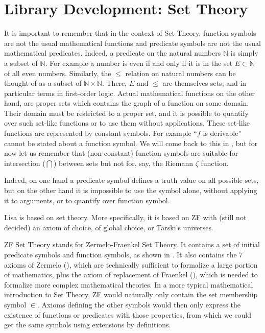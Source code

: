 
\chapter{Library Development: Set Theory}
\label{chapt:settheory}

It is important to remember that in the context of Set Theory, function symbols are not the usual mathematical functions and predicate symbols are not the usual mathematical predicates. Indeed, a predicate on the natural numbers $\mathbb N$ is simply a subset of $\mathbb N$. For example a number is even if and only if it is in the set $E \subset \mathbb N$ of all even numbers. Similarly, the $\leq$ relation on natural numbers can be thought of as a subset of $\mathbb N \times \mathbb N$. There, $E$ and $\leq$ are themselves sets, and in particular terms in first-order logic.
Actual mathematical functions on the other hand, are proper sets which contains the graph of a function on some domain. Their domain must be restricted to a proper set, and it is possible to quantify over such set-like functions or to use them without applications. These set-like functions are represented by constant symbols.  For example ``$f$ is derivable'' cannot be stated about a function symbol. We will come back to this in , but for now let us remember that (non-constant) function symbols are suitable for intersection ($\bigcap$) between sets but not for, say, the Riemann $\zeta$ function.

Indeed, on one hand a predicate symbol defines a truth value on all possible sets, but on the other hand it is impossible to use the symbol alone, without applying it to arguments, or to quantify over function symbol.

Lisa is based on set theory. More specifically, it is based on ZF with (still not decided) an axiom of choice, of global choice, or Tarski's universes.

ZF Set Theory stands for Zermelo-Fraenkel Set Theory. It contains a set of initial predicate symbols and function symbols, as shown in . It also contains the 7 axioms of Zermelo (), which are technically sufficient to formalize a large portion of mathematics, plus the axiom of replacement of Fraenkel (), which is needed to formalize more complex mathematical theories.
In a more typical mathematical introduction to Set Theory, ZF would naturally only contain the set membership symbol $\in$. Axioms defining the other symbols would then only express the existence of functions or predicates with those properties, from which we could get the same symbols using extensions by definitions.

